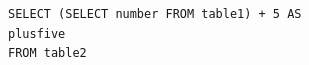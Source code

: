 \begin{figure}[htpb]
    \begin{subfigure}[b]{\textwidth}
    \begin{tcolorbox}[colback=white, colframe=black, boxrule=1pt, arc=0pt]
        \begin{verbatim}
SELECT (SELECT number FROM table1) + 5 AS plusfive
FROM table2
        \end{verbatim}
    \end{tcolorbox}
    \end{subfigure}

    \medskip

    \begin{subfigure}[c]{140pt}
        \centering

\end{subfigure}
\end{figure}
